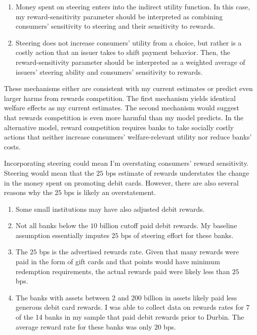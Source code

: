 \documentclass[main.tex]{subfiles}
\begin{document}
\begin{refsection}
\begin{enumerate}
    \item Money spent on steering enters into the indirect utility function.
In this case, my reward-sensitivity parameter should be interpreted as combining consumers' sensitivity to steering and their sensitivity to rewards.
    \item Steering does not increase consumers' utility from a choice, but rather is a costly action that an issuer takes to shift payment behavior.
Then, the reward-sensitivity parameter should be interpreted as a weighted average of issuers' steering ability and consumers' sensitivity to rewards.
\end{enumerate}

These mechanisms either are consistent with my current estimates or predict even larger harms from rewards competition.
The first mechanism yields identical welfare effects as my current estimates.
The second mechanism would suggest that rewards competition is even more harmful than my model predicts.
In the alternative model, reward competition requires banks to take socially costly actions that neither increase consumers' welfare-relevant utility nor reduce banks' costs.

Incorporating steering could mean I'm overstating consumers' reward sensitivity.
Steering would mean that the $25$ bps estimate of rewards understates the change in the money spent on promoting debit cards.
However, there are also several reasons why the $25$ bps is likely an overstatement.
\begin{enumerate}
    \item Some small institutions may have also adjusted debit rewards. 
    \item Not all banks below the $10$ billion cutoff paid debit rewards.
My baseline assumption essentially imputes $25$ bps of steering effort for these banks.
    \item The $25$ bps is the advertised rewards rate.
Given that many rewards were paid in the form of gift cards and that points would have minimum redemption requirements, the actual rewards paid were likely less than $25$ bps.
    \item The banks with assets between $2$ and $200$ billion in assets likely paid less generous debit card rewards.
I was able to collect data on rewards rates for 7 of the 14 banks in my sample that paid debit rewards prior to Durbin.
The average reward rate for these banks was only $20$ bps.
\end{enumerate}


\end{refsection}
\end{document}
